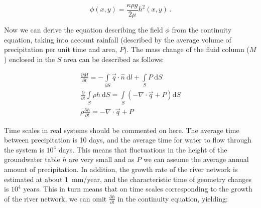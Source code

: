 \documentclass[]{pracamgr}
\begin{document}
      \begin{equation}
        \phi(x,y) = \frac{\kappa \rho g}{2\mu}h^2(x,y) \,.
      \end{equation}
    
      Now we can derive the equation describing the field $\phi$ from the continuity equation, taking into account rainfall (described by the average volume of precipitation per unit time and area, $P$). The mass change of the fluid column ($M$) enclosed in the $S$ area can be described as follows:
      

      \begin{gather*}
        \frac{\partial M}{\partial t}=- \int\limits_{\partial S} \vec{q}\cdot \hat{n} \ \textrm{d}l + \int\limits_S P \ \textrm{d}S
        \\
        \frac{\partial}{\partial t} \int\limits_S \rho h \ \textrm{d}S=\int\limits_S \left(-\nabla \cdot \vec{q} + P\right)\textrm{d}S
        \\
        \rho \frac{\partial h}{\partial t}=-\nabla \cdot \vec{q} + P
      \end{gather*}	

      Time scales in real systems should be commented on here. The average time between precipitation is 10 days, and the average time for water to flow through the system is $10^4$ days. This means that fluctuations in the height of the groundwater table $h$ are very small and as $P$ we can assume the average annual amount of precipitation. In addition, the growth rate of the river network is estimated at about 1~mm/year, and the characteristic time of geometry changes is $10^4$ years. This in turn means that on time scales corresponding to the growth of the river network, we can omit $ \frac{\partial h} {\partial t} $ in the continuity equation, yielding:  
      
\end{document}
